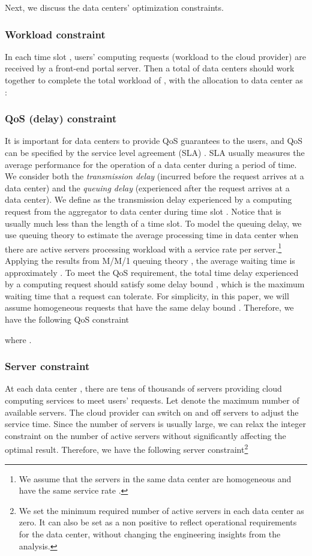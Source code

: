 \documentclass[journal]{IEEEtran}
\begin{document}
	Next, we discuss the data centers' optimization constraints.
	
	\subsubsection{Workload constraint}
	In each time slot , users' computing requests (workload to the cloud provider) are received by a front-end portal server. Then a total of  data centers should work together to complete the total workload of , with the allocation to data center  as :
	
	
	\subsubsection{QoS (delay) constraint}
	It is important for data centers to provide QoS guarantees to the users, and QoS can be specified by the service level agreement (SLA) \cite{sla}. SLA usually measures the average performance for the operation of a data center during a period of time. We consider both the \emph{transmission delay} (incurred before the request arrives at a data center) and the \emph{queuing delay} (experienced after the request arrives at a data center). We define  as the transmission delay experienced by a computing request from the aggregator to data center  during time slot . Notice that  is usually much less than the length of a time slot. To model the queuing delay, we use queuing theory to estimate the average processing time in data center  when there are  active servers processing workload  with a service rate  per server.\footnote{We assume that the servers in the same data center  are homogeneous and have the same service rate .} Applying the results from M/M/1 queuing theory \cite{sigmetrics}, the average waiting time is approximately . To meet the QoS requirement, the total time delay experienced by a computing request should satisfy some delay bound , which is the maximum waiting time that a request can tolerate. For simplicity, in this paper, we will assume homogeneous requests that have the same delay bound . Therefore, we have the following QoS constraint
	
	where .
	
	\subsubsection{Server constraint}
	At each data center , there are tens of thousands of servers providing cloud computing services to meet users' requests. Let  denote the maximum number of available servers. The cloud provider can switch on and off servers to adjust the service time. Since the number of servers is usually large, we can relax the integer constraint on the number of active servers without significantly affecting the optimal result. Therefore, we have the following server constraint\footnote{We set the minimum required number of active servers in each data center as zero. It can also be set as a non positive to reflect operational requirements for the data center, without changing the engineering insights from the analysis.}
	
\end{document}
